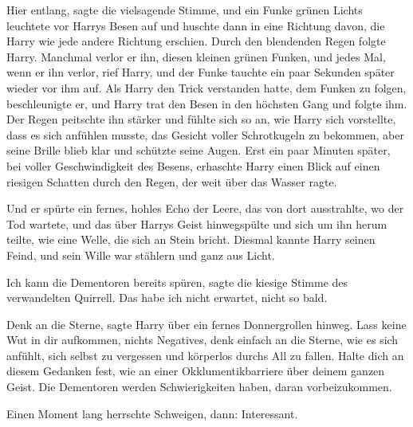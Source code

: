 \glqq{}Hier entlang\grqq{}, sagte die vielsagende Stimme, und ein Funke grünen
Lichts leuchtete vor Harrys Besen auf und huschte dann in eine Richtung davon,
die Harry wie jede andere Richtung erschien. Durch den blendenden Regen folgte
Harry. Manchmal verlor er ihn, diesen kleinen grünen Funken, und jedes Mal, wenn
er ihn verlor, rief Harry, und der Funke tauchte ein paar Sekunden später wieder
vor ihm auf. Als Harry den Trick verstanden hatte, dem Funken zu folgen,
beschleunigte er, und Harry trat den Besen in den höchsten Gang und folgte ihm.
Der Regen peitschte ihn stärker und fühlte sich so an, wie Harry sich
vorstellte, dass es sich anfühlen musste, das Gesicht voller Schrotkugeln zu
bekommen, aber seine Brille blieb klar und schützte seine Augen. Erst ein paar
Minuten später, bei voller Geschwindigkeit des Besens, erhaschte Harry einen
Blick auf einen riesigen Schatten durch den Regen, der weit über das Wasser
ragte.

Und er spürte ein fernes, hohles Echo der Leere, das von dort ausstrahlte, wo
der Tod wartete, und das über Harrys Geist hinwegspülte und sich um ihn herum
teilte, wie eine Welle, die sich an Stein bricht. Diesmal kannte Harry seinen
Feind, und sein Wille war stählern und ganz aus Licht.

\glqq{}Ich kann die Dementoren bereits spüren\grqq{}, sagte die kiesige Stimme
des verwandelten Quirrell. \glqq{}Das habe ich nicht erwartet, nicht so bald.\grqq{}

\glqq{}Denk an die Sterne\grqq{}, sagte Harry über ein fernes Donnergrollen
hinweg. \glqq{}Lass keine Wut in dir aufkommen, nichts Negatives, denk einfach an
die Sterne, wie es sich anfühlt, sich selbst zu vergessen und körperlos durchs
All zu fallen. Halte dich an diesem Gedanken fest, wie an einer
Okklumentikbarriere über deinem ganzen Geist. Die Dementoren werden
Schwierigkeiten haben, daran vorbeizukommen.\grqq{}

Einen Moment lang herrschte Schweigen, dann: \glqq{}Interessant.\grqq{}

